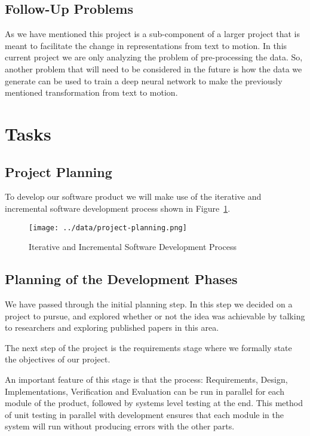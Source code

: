 \documentclass{scrreprt}
\begin{document}
\subsection{Follow-Up Problems}

{As we have mentioned this project is a sub-component of a larger project that
is meant to facilitate the change in representations from text to motion. In
this current project we are only analyzing the problem of pre-processing the
data. So, another problem that will need to be considered in the future is
how the data we generate can be used to train a deep neural network to make the
previously mentioned transformation from text to motion.}

\section{Tasks}

\subsection{Project Planning}

{To develop our software product we will make use of the iterative and
incremental software development process shown in Figure~\ref{fig-project-planning}.}

{\begin{figure}[!ht]
        \label{fig-project-planning}
        \caption{Iterative and Incremental Software Development Process}
        \texttt{[image: ../data/project-planning.png]}
\end{figure}}

\subsection{Planning of the Development Phases}

{We have passed through the initial planning step. In this step we decided on
a project to pursue, and explored whether or not the idea was achievable by
talking to researchers and exploring published papers in this area.}

{The next step of the project is the requirements stage where we formally state
the objectives of our project.}

{An important feature of this stage is that the process: Requirements, Design,
Implementations, Verification and Evaluation can be run in parallel for each
module of the product, followed by systems level testing at the end. This
method of unit testing in parallel with development ensures that each module in
the system will run without producing errors with the other parts.}
\end{document}
